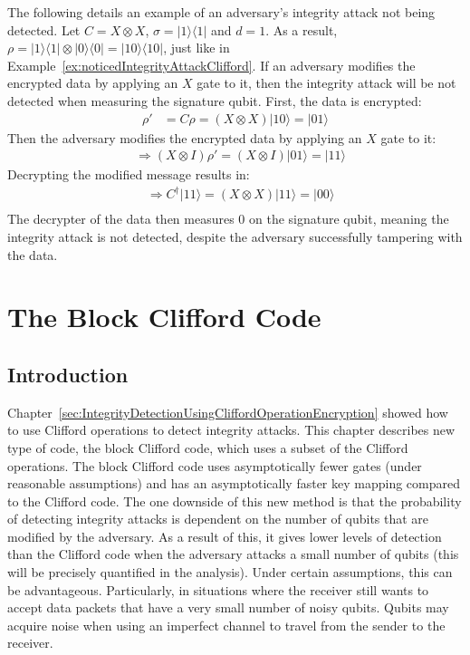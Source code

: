\begin{example}
\label{ex:unnoticedIntegrityAttackClifford}
		The following details an example of an adversary's integrity attack not being detected. Let $C = X \otimes X$, $\sigma = |1\rangle\langle1|$ and $d = 1$. As a result, $\rho = |1\rangle\langle1| \otimes |0\rangle\langle0| = |10\rangle\langle10|$, just like in Example~\ref{ex:noticedIntegrityAttackClifford}. If an adversary modifies the encrypted data by applying an $X$ gate to it, then the integrity attack will be not detected when measuring the signature qubit. First, the data is encrypted:
	\begin{align}
	\rho' &= C\rho = (X \otimes X)|10\rangle = |01\rangle
	\end{align}
    Then the adversary modifies the encrypted data by applying an $X$ gate to it:
	\begin{align}
	& \Rightarrow (X \otimes I) \rho' = (X \otimes I) |01\rangle = |11\rangle
	\end{align}
	Decrypting the modified message results in:
	\begin{align}
	& \Rightarrow C^{\dagger}|11\rangle = (X \otimes X)|11\rangle = |00\rangle\\
	\end{align}
	The decrypter of the data then measures $0$ on the signature qubit, meaning the integrity attack is not detected, despite the adversary successfully tampering with the data. 
\end{example}

\pagebreak
\chapter{The Block Clifford Code}
\label{sec:PerezCode}
\section{Introduction}
Chapter~\ref{sec:IntegrityDetectionUsingCliffordOperationEncryption} showed how to use Clifford operations to detect integrity attacks. This chapter describes new type of code, the block Clifford code, which uses a subset of the Clifford operations. The block Clifford code uses asymptotically fewer gates (under reasonable assumptions) and has an asymptotically faster key mapping compared to the Clifford code. The one downside of this new method is that the probability of detecting integrity attacks is dependent on the number of qubits that are modified by the adversary. As a result of this, it gives lower levels of detection than the Clifford code when the adversary attacks a small number of qubits (this will be precisely quantified in the analysis). Under certain assumptions, this can be advantageous. Particularly, in situations where the receiver still wants to accept data packets that have a very small number of noisy qubits. Qubits may acquire noise when using an imperfect channel to travel from the sender to the receiver.

